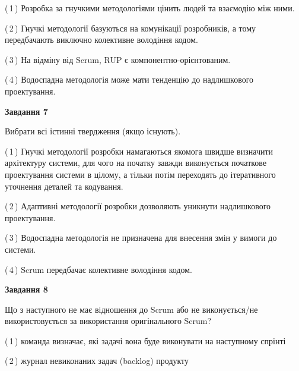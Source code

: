 \documentclass[10pt, ukrainian]{article}
\begin{document}
{\begin {large}
(\,1\,) Розробка за гнучкими методологіями цінить людей та взаємодію між ними. %



(\,2\,) Гнучкі методології базуються на комунікації розробників, а тому передбачають виключно колективне володіння кодом. %



(\,3\,) На відміну від Scrum, RUP є компонентно-орієнтованим. %



(\,4\,) Водоспадна методологія може мати тенденцію до надлишкового проектування. %


{\begin {center}\textbf{Завдання 7}\end {center}}\par
Вибрати всі істинні твердження (якщо існують).\par
\vspace{2mm}



(\,1\,) Гнучкі методології розробки намагаються якомога швидше визначити архітектуру системи, для чого на початку завжди виконується початкове проектування системи в цілому, а тільки потім переходять до ітеративного уточнення деталей та кодування. %



(\,2\,) Адаптивні методології розробки дозволяють уникнути надлишкового проектування. %



(\,3\,) Водоспадна методологія не призначена для внесення змін у вимоги до системи. %



(\,4\,) Scrum передбачає колективне володіння кодом. %


{\begin {center}\textbf{Завдання 8}\end {center}}\par
Що з наступного не має відношення до Scrum або не виконується/не використовується за використання оригінального Scrum?\par
\vspace{2mm}



(\,1\,) команда визначає, які задачі вона буде виконувати на наступному спрінті%



(\,2\,) журнал невиконаних задач (backlog) продукту%




\end{large}}
\end{document}
